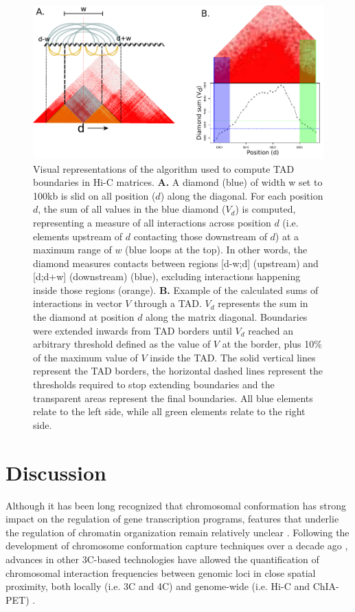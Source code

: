 \documentclass[11pt,a4paper]{report}
\begin{document}
\begin{figure}[ht]
	\includegraphics[width=1\textwidth]{Figures/6_interactions.pdf}
	\caption{Visual representations of the algorithm used to compute TAD boundaries in Hi-C matrices. \textbf{A.} A diamond (blue) of width w set to 100kb is slid on all position ($d$) along the diagonal. For each position $d$, the sum of all values in the blue diamond ($V_d$) is computed, representing a measure of all interactions across position $d$ (i.e. elements upstream of $d$ contacting those downstream of $d$) at a maximum range of $w$ (blue loops at the top). In other words, the diamond measures contacts between regions [d-w;d] (upstream) and [d;d+w] (downstream) (blue), excluding interactions happening inside those regions (orange). \textbf{B.} Example of the calculated sums of interactions in vector $V$ through a TAD. $V_d$ represents the sum in the diamond at position $d$ along the matrix diagonal. Boundaries were extended inwards from TAD borders until $V_d$ reached an arbitrary threshold defined as the value of $V$ at the border, plus 10\% of the maximum value of $V$ inside the TAD. The solid vertical lines represent the TAD borders, the horizontal dashed lines represent the thresholds required to stop extending boundaries and the transparent areas represent the final boundaries. All blue elements relate to the left side, while all green elements relate to the right side.}
	\label{interact_hic}
\end{figure}


\FloatBarrier
\section*{Discussion}

Although it has been long recognized that chromosomal conformation has strong impact on the regulation of gene transcription programs, features that underlie the regulation of chromatin organization remain relatively unclear \cite{Bonev2016}⁠. Following the development of chromosome conformation capture techniques over a decade ago \cite{Dekker2002}⁠, advances in other 3C-based technologies have allowed the quantification of chromosomal interaction frequencies between genomic loci in close spatial proximity, both locally (i.e. 3C and 4C) and genome-wide (i.e. Hi-C and ChIA-PET) \cite{Dekker2013}.
\end{document}
